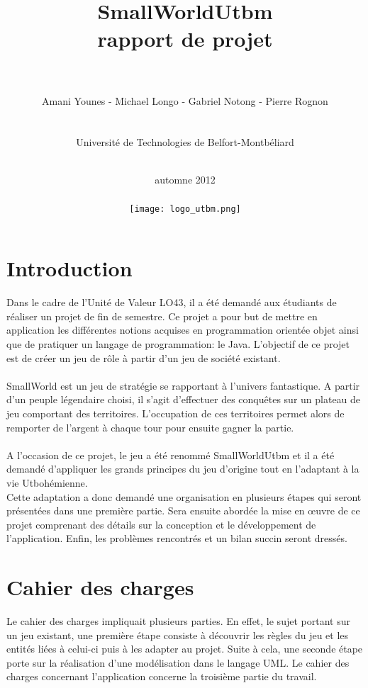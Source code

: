 \documentclass[a4paper, 11pt]{article}
\title{\vspace{5cm}SmallWorldUtbm \\ rapport de projet \\ \ \\}
\date{automne 2012\\ \ \\ \vspace*{3cm}
	\texttt{[image: logo\_utbm.png]}
	}
\author{Amani Younes - Michael Longo - Gabriel Notong - Pierre Rognon \\ \ \\ \ \\ Université de Technologies de Belfort-Montbéliard\\ \ \\}
\begin{document}
	
	\maketitle
	
	\newpage
	
	
	\newpage
	
	\section*{Introduction}
	
	Dans le cadre de l'Unité de Valeur LO43, il a été demandé aux étudiants de réaliser un projet de fin de semestre. Ce projet a pour but de mettre en application les différentes notions acquises en programmation orientée objet ainsi que de pratiquer un langage de programmation: le Java. L'objectif de ce projet est de créer un jeu de rôle à partir d'un jeu de société existant.
	\paragraph{} SmallWorld est un jeu de stratégie se rapportant à l'univers fantastique. A partir d'un peuple légendaire choisi, il s'agit d'effectuer des conquêtes sur un plateau de jeu comportant des territoires. L'occupation de ces territoires permet alors de remporter de l'argent à chaque tour pour ensuite gagner la partie. 
	\paragraph{}A l'occasion de ce projet, le jeu a été renommé SmallWorldUtbm et il a été demandé d'appliquer les grands principes du jeu d'origine tout en l'adaptant à la vie Utbohémienne. \\
	Cette adaptation a donc demandé une organisation en plusieurs étapes qui seront présentées dans une première partie. Sera ensuite abordée la mise en œuvre de ce projet comprenant des détails sur la conception et le développement de l'application. Enfin, les problèmes rencontrés et un bilan succin seront dressés.
	
	
	\newpage
	
	\section{Cahier des charges}
	
	Le cahier des charges impliquait plusieurs parties. En effet, le sujet portant sur un jeu existant, une première étape consiste à découvrir les règles du jeu et les entités liées à celui-ci puis à les adapter au projet. Suite à cela, une seconde étape porte sur la réalisation d'une modélisation dans le langage UML. Le cahier des charges concernant l'application concerne la troisième partie du travail.
	
\end{document}
